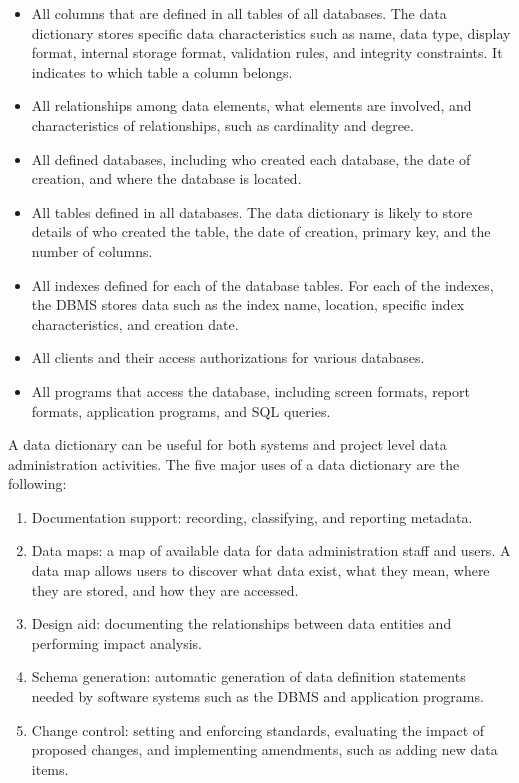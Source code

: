 \documentclass[
]{article}
\begin{document}
\begin{itemize}
\item
  All columns that are defined in all tables of all databases. The
  data dictionary stores specific data characteristics such as name,
  data type, display format, internal storage format, validation
  rules, and integrity constraints. It indicates to which table a
  column belongs.
\item
  All relationships among data elements, what elements are involved,
  and characteristics of relationships, such as cardinality and
  degree.
\item
  All defined databases, including who created each database, the date
  of creation, and where the database is located.
\item
  All tables defined in all databases. The data dictionary is likely
  to store details of who created the table, the date of creation,
  primary key, and the number of columns.
\item
  All indexes defined for each of the database tables. For each of the
  indexes, the DBMS stores data such as the index name, location,
  specific index characteristics, and creation date.
\item
  All clients and their access authorizations for various databases.
\item
  All programs that access the database, including screen formats,
  report formats, application programs, and SQL queries.
\end{itemize}

A data dictionary can be useful for both systems and project level data
administration activities. The five major uses of a data dictionary are
the following:

\begin{enumerate}
\def\labelenumi{\arabic{enumi}.}
\item
  Documentation support: recording, classifying, and reporting
  metadata.
\item
  Data maps: a map of available data for data administration staff and
  users. A data map allows users to discover what data exist, what
  they mean, where they are stored, and how they are accessed.
\item
  Design aid: documenting the relationships between data entities and
  performing impact analysis.
\item
  Schema generation: automatic generation of data definition
  statements needed by software systems such as the DBMS and
  application programs.
\item
  Change control: setting and enforcing standards, evaluating the
  impact of proposed changes, and implementing amendments, such as
  adding new data items.
\end{enumerate}
\end{document}
